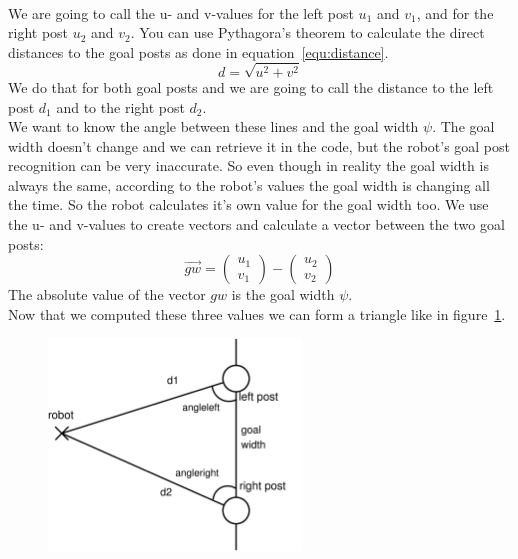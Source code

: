 \documentclass[lnicst,a4paper]{svmultln}
\begin{document}
\\
We are going to call the u- and v-values for the left post \(u_{1}\) and \(v_{1}\), and for the right post \(u_{2}\) and \(v_{2}\). You can use Pythagora's theorem to calculate the direct distances to the goal posts as done in equation~\ref{equ:distance}.
\begin{equation}
	d = \sqrt{u^2+v^2}
	\label{equ:distance}
\end{equation}
We do that for both goal posts and we are going to call the distance to the left post \(d_{1}\) and to the right post \(d_{2}\). 
\\
We want to know the angle between these lines and the goal width \(\psi\). The goal width doesn't change and we can retrieve it in the code, but the robot's goal post recognition can be very inaccurate. So even though in reality the goal width is always the same, according to the robot's values the goal width is changing all the time. So the robot calculates it's own value for the goal width too. We use the u- and v-values to create vectors and calculate a vector between the two goal posts:
\begin{equation}
	\vec{gw}=\left(\begin{array}{c} u_{1} \\ v_{1} \end{array}\right) - \left(\begin{array}{c} u_{2} \\ v_{2} \end{array}\right)
\end{equation}
The absolute value of the vector \(gw\) is the goal width \(\psi\).
\\
Now that we computed these three values we can form a triangle like in figure~\ref{fig:triangle}.
\begin{figure}
 	\centerline{\includegraphics[width=0.6\textwidth]{triangle.pdf}}
	{\caption{}\label{fig:triangle}}
\end{figure}
\end{document}
